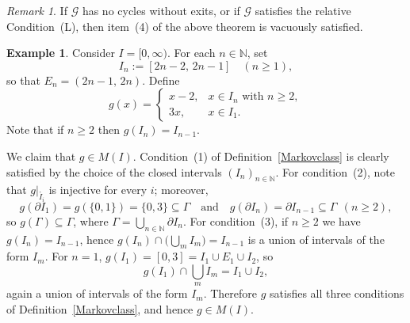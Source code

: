 \documentclass[12pt, reqno]{amsart}
\theoremstyle{definition}
\newtheorem{example}[theorem]{Example}
\theoremstyle{remark}
\newtheorem{remark}[theorem]{Remark}
\numberwithin{equation}{section}
\begin{document}
\begin{remark}
If $\mathcal{G}$ has no cycles without exits, or if $\mathcal{G}$ satisfies the relative Condition~(L), then item~(4) of the above theorem is vacuously satisfied.
\end{remark}




\begin{example}
Consider $I=[0,\infty)$. For each $n\in\mathbb{N}$, set
\[
I_n:=[2n-2,\,2n-1]\quad(n\ge 1),
\]
so that $E_n=(2n-1,\,2n)$. Define
\[
g(x)=
\begin{cases}
x-2, & x\in I_n \text{ with } n\ge 2,\\
3x,  & x\in I_1.
\end{cases}
\]
Note that if $n\ge 2$ then $g(I_n)=I_{n-1}$.

\begin{center}
\end{center}

We claim that $g\in M(I)$. Condition~(1) of Definition~\ref{Markovclass} is
clearly satisfied by the choice of the closed intervals $(I_n)_{n\in\mathbb{N}}$.
For condition~(2), note that $g|_{\mathring{I_i}}$ is injective for every $i$;
moreover,
\[
g(\partial I_1)=g(\{0,1\})=\{0,3\}\subseteq \Gamma
\quad\text{and}\quad
g(\partial I_n)=\partial I_{n-1}\subseteq \Gamma\ \ (n\ge 2),
\]
so $g(\Gamma)\subseteq \Gamma$, where $\Gamma=\bigcup_{n\in\mathbb{N}}\partial I_n$.
For condition~(3), if $n\ge 2$ we have $g(I_n)=I_{n-1}$, hence
$g(I_n)\cap\big(\bigcup_{m} I_m\big)=I_{n-1}$ is a union of intervals of the
form $I_m$. For $n=1$, $g(I_1)=[0,3]=I_1\cup E_1\cup I_2$, so
\[
g(I_1)\cap\bigcup_{m} I_m = I_1\cup I_2,
\]
again a union of intervals of the form $I_m$. Therefore $g$ satisfies all three
conditions of Definition~\ref{Markovclass}, and hence $g\in M(I)$.


\end{example}
\end{document}
